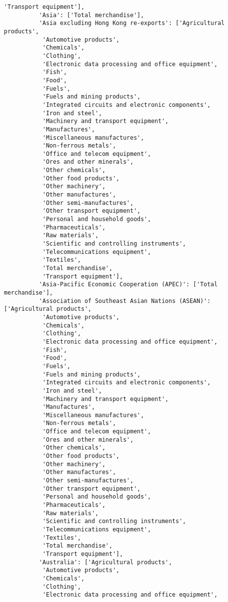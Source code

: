 \documentclass[11pt]{article}
\begin{document}
\begin{Verbatim}[commandchars=\\\{\}]
           'Transport equipment'],
          'Asia': ['Total merchandise'],
          'Asia excluding Hong Kong re-exports': ['Agricultural products',
           'Automotive products',
           'Chemicals',
           'Clothing',
           'Electronic data processing and office equipment',
           'Fish',
           'Food',
           'Fuels',
           'Fuels and mining products',
           'Integrated circuits and electronic components',
           'Iron and steel',
           'Machinery and transport equipment',
           'Manufactures',
           'Miscellaneous manufactures',
           'Non-ferrous metals',
           'Office and telecom equipment',
           'Ores and other minerals',
           'Other chemicals',
           'Other food products',
           'Other machinery',
           'Other manufactures',
           'Other semi-manufactures',
           'Other transport equipment',
           'Personal and household goods',
           'Pharmaceuticals',
           'Raw materials',
           'Scientific and controlling instruments',
           'Telecommunications equipment',
           'Textiles',
           'Total merchandise',
           'Transport equipment'],
          'Asia-Pacific Economic Cooperation (APEC)': ['Total merchandise'],
          'Association of Southeast Asian Nations (ASEAN)': ['Agricultural products',
           'Automotive products',
           'Chemicals',
           'Clothing',
           'Electronic data processing and office equipment',
           'Fish',
           'Food',
           'Fuels',
           'Fuels and mining products',
           'Integrated circuits and electronic components',
           'Iron and steel',
           'Machinery and transport equipment',
           'Manufactures',
           'Miscellaneous manufactures',
           'Non-ferrous metals',
           'Office and telecom equipment',
           'Ores and other minerals',
           'Other chemicals',
           'Other food products',
           'Other machinery',
           'Other manufactures',
           'Other semi-manufactures',
           'Other transport equipment',
           'Personal and household goods',
           'Pharmaceuticals',
           'Raw materials',
           'Scientific and controlling instruments',
           'Telecommunications equipment',
           'Textiles',
           'Total merchandise',
           'Transport equipment'],
          'Australia': ['Agricultural products',
           'Automotive products',
           'Chemicals',
           'Clothing',
           'Electronic data processing and office equipment',

\end{Verbatim}
\end{document}
